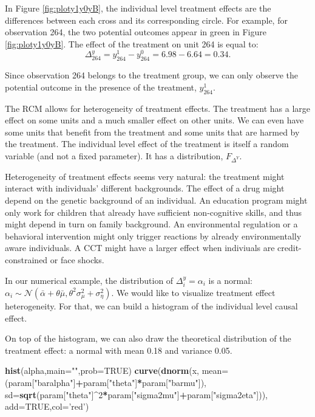 \documentclass[]{book}
\newenvironment{Shaded}{\begin{snugshade}}{\end{snugshade}}
\newcommand{\KeywordTok}[1]{\textcolor[rgb]{0.13,0.29,0.53}{\textbf{#1}}}
\newcommand{\DataTypeTok}[1]{\textcolor[rgb]{0.13,0.29,0.53}{#1}}
\newcommand{\DecValTok}[1]{\textcolor[rgb]{0.00,0.00,0.81}{#1}}
\newcommand{\StringTok}[1]{\textcolor[rgb]{0.31,0.60,0.02}{#1}}
\newcommand{\OtherTok}[1]{\textcolor[rgb]{0.56,0.35,0.01}{#1}}
\newcommand{\OperatorTok}[1]{\textcolor[rgb]{0.81,0.36,0.00}{\textbf{#1}}}
\newcommand{\NormalTok}[1]{#1}
\theoremstyle{definition}
\theoremstyle{definition}
\theoremstyle{definition}
\theoremstyle{remark}
\let\BeginKnitrBlock\begin \let\EndKnitrBlock\end
\begin{document}
In Figure \ref{fig:ploty1y0yB}, the individual level treatment effects
are the differences between each cross and its corresponding circle. For
example, for observation 264, the two potential outcomes appear in green
in Figure \ref{fig:ploty1y0yB}. The effect of the treatment on unit 264
is equal to: \[
\Delta^y_{264}=y^1_{264}-y^0_{264}=6.98-6.64=0.34.
\]

Since observation 264 belongs to the treatment group, we can only
observe the potential outcome in the presence of the treatment,
\(y^1_{264}\).

The RCM allows for heterogeneity of treatment effects. The treatment has
a large effect on some units and a much smaller effect on other units.
We can even have some units that benefit from the treatment and some
units that are harmed by the treatment. The individual level effect of
the treatment is itself a random variable (and not a fixed parameter).
It has a distribution, \(F_{\Delta^Y}\).

Heterogeneity of treatment effects seems very natural: the treatment
might interact with individuals' different backgrounds. The effect of a
drug might depend on the genetic background of an individual. An
education program might only work for children that already have
sufficient non-cognitive skills, and thus might depend in turn on family
background. An environmental regulation or a behavioral intervention
might only trigger reactions by already environmentally aware
individuals. A CCT might have a larger effect when indiviuals are
credit-constrained or face shocks.

\BeginKnitrBlock{example}
\protect\hypertarget{exm:unnamed-chunk-8}{}{\label{exm:unnamed-chunk-8} }In
our numerical example, the distribution of \(\Delta^y_i=\alpha_i\) is a
normal:
\(\alpha_i\sim\mathcal{N}(\bar{\alpha}+\theta\bar{\mu},\theta^2\sigma^2_{\mu}+\sigma^2_{\eta})\).
We would like to visualize treatment effect heterogeneity. For that, we
can build a histogram of the individual level causal effect.
\EndKnitrBlock{example} On top of the histogram, we can also draw the
theoretical distribution of the treatment effect: a normal with mean
0.18 and variance 0.05.

\begin{Shaded}
\begin{Highlighting}[]
\KeywordTok{hist}\NormalTok{(alpha,}\DataTypeTok{main=}\StringTok{""}\NormalTok{,}\DataTypeTok{prob=}\OtherTok{TRUE}\NormalTok{)}
\KeywordTok{curve}\NormalTok{(}\KeywordTok{dnorm}\NormalTok{(x, }\DataTypeTok{mean=}\NormalTok{(param[}\StringTok{"baralpha"}\NormalTok{]}\OperatorTok{+}\NormalTok{param[}\StringTok{"theta"}\NormalTok{]}\OperatorTok{*}\NormalTok{param[}\StringTok{"barmu"}\NormalTok{]), }\DataTypeTok{sd=}\KeywordTok{sqrt}\NormalTok{(param[}\StringTok{"theta"}\NormalTok{]}\OperatorTok{^}\DecValTok{2}\OperatorTok{*}\NormalTok{param[}\StringTok{"sigma2mu"}\NormalTok{]}\OperatorTok{+}\NormalTok{param[}\StringTok{"sigma2eta"}\NormalTok{])), }\DataTypeTok{add=}\OtherTok{TRUE}\NormalTok{,}\DataTypeTok{col=}\StringTok{'red'}\NormalTok{)}
\end{Highlighting}
\end{Shaded}
\end{document}
